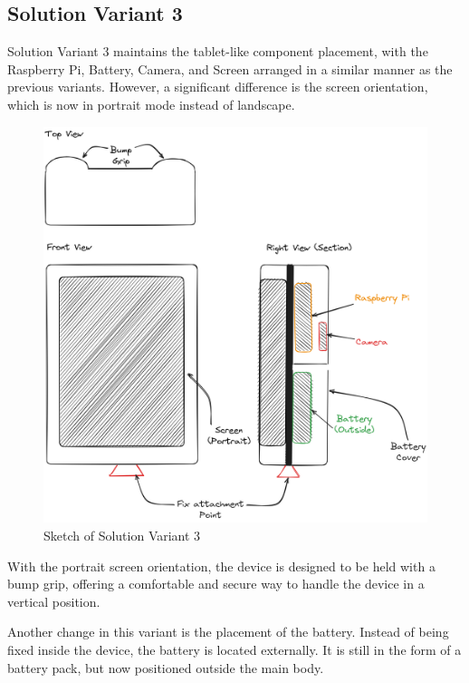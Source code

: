 \subsection{Solution Variant 3}

Solution Variant 3 maintains the tablet-like component placement, with the Raspberry Pi, Battery, Camera, and Screen arranged in a similar manner as the previous variants. However, a significant difference is the screen orientation, which is now in portrait mode instead of landscape.

\begin{figure}[ht!]
    \centering
    \includegraphics[width=\linewidth]{texs/Part1/chapter3/image/v3.png}
    \caption{Sketch of Solution Variant 3}
    \label{fig:sketch-solution-variant-3}
\end{figure}

With the portrait screen orientation, the device is designed to be held with a bump grip, offering a comfortable and secure way to handle the device in a vertical position.

Another change in this variant is the placement of the battery. Instead of being fixed inside the device, the battery is located externally. It is still in the form of a battery pack, but now positioned outside the main body.

